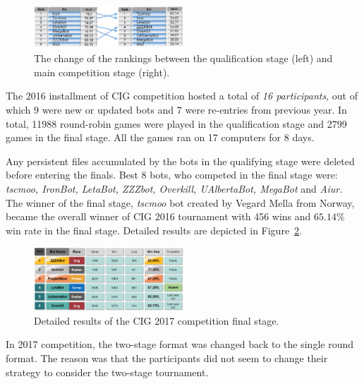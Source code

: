 \begin{figure}[t]
  \centering
  \includegraphics[width=0.5\textwidth]{fig/cig-two-stage-result.png}
  \caption{The change of the rankings between the qualification stage (left) and main competition stage (right).}
  \label{figCIGtwostages}
\end{figure}

The 2016 installment of CIG competition hosted a total of {\em 16 participants}, out of which 9 were new or updated bots and 7 were re-entries from previous year. 
In total, 11988 round-robin games were played in the qualification stage and 2799 games in the final stage. 
All the games ran on 17 computers for 8 days. 

Any persistent files accumulated by the bots in the qualifying stage were deleted before entering the finals. 
Best 8 bots, who competed in the final stage were: {\em tscmoo, IronBot, LetaBot, ZZZbot, Overkill, UAlbertaBot, MegaBot} and {\em Aiur}.
The winner of the final stage, {\em tscmoo} bot created by Vegard Mella from Norway, became the overall winner of CIG 2016 tournament with 456 wins and $65.14\%$ win rate in the final stage. Detailed results are depicted in Figure~\ref{figCIGresults}. 

\begin{figure}[t]
  \centering
  \includegraphics[width=0.5\textwidth]{fig/cig-results.png}
  \caption{Detailed results of the CIG 2017 competition final stage.}
  \label{figCIGresults}
\end{figure}

In 2017 competition, the two-stage format was changed back to the single round format. The reason was that the participants did not seem to change their strategy to consider the two-stage tournament. 

